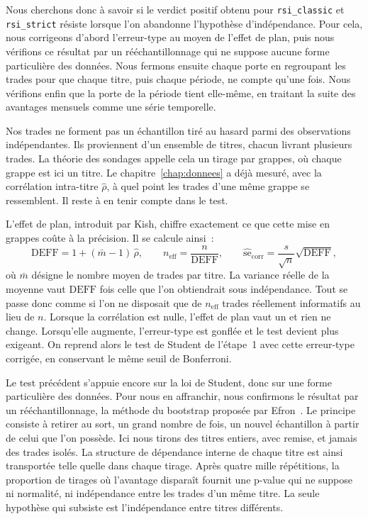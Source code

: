 Nous cherchons donc à savoir si le verdict positif obtenu pour
\texttt{rsi\_classic} et \texttt{rsi\_strict} résiste lorsque l'on
abandonne l'hypothèse d'indépendance. Pour cela, nous corrigeons d'abord
l'erreur-type au moyen de l'effet de plan, puis nous vérifions ce
résultat par un rééchantillonnage qui ne suppose aucune forme
particulière des données. Nous fermons ensuite chaque porte en
regroupant les trades pour que chaque titre, puis chaque période, ne
compte qu'une fois. Nous vérifions enfin que la porte de la période
tient elle-même, en traitant la suite des avantages mensuels comme une
série temporelle.


Nos trades ne forment pas un échantillon tiré au hasard parmi des
observations indépendantes. Ils proviennent d'un ensemble de titres,
chacun livrant plusieurs trades. La théorie des sondages appelle cela un
tirage par grappes, où chaque grappe est ici un titre. Le
chapitre~\ref{chap:donnees} a déjà mesuré, avec la corrélation
intra-titre $\hat\rho$, à quel point les trades d'une même grappe se
ressemblent. Il reste à en tenir compte dans le test.

L'effet de plan, introduit par Kish, chiffre exactement ce que cette
mise en grappes coûte à la précision. Il se calcule ainsi~:
\[
  \mathrm{DEFF} = 1 + (\bar m - 1)\,\hat\rho,
  \qquad n_{\mathrm{eff}} = \frac{n}{\mathrm{DEFF}},
  \qquad \widehat{\mathrm{se}}_{\mathrm{corr}}
        = \frac{s}{\sqrt{n}}\sqrt{\mathrm{DEFF}},
\]
où $\bar m$ désigne le nombre moyen de trades par titre. La variance
réelle de la moyenne vaut $\mathrm{DEFF}$ fois celle que l'on
obtiendrait sous indépendance. Tout se passe donc comme si l'on ne
disposait que de $n_{\mathrm{eff}}$ trades réellement informatifs au
lieu de $n$. Lorsque la corrélation est nulle, l'effet de plan vaut un
et rien ne change. Lorsqu'elle augmente, l'erreur-type est gonflée et le
test devient plus exigeant. On reprend alors le test de Student de
l'étape~1 avec cette erreur-type corrigée, en conservant le même seuil
de Bonferroni.


Le test précédent s'appuie encore sur la loi de Student, donc sur une
forme particulière des données. Pour nous en affranchir, nous confirmons
le résultat par un rééchantillonnage, la méthode du bootstrap proposée
par Efron~\cite{efron1979}. Le principe consiste à retirer au sort, un
grand nombre de fois, un nouvel échantillon à partir de celui que l'on
possède. Ici nous tirons des titres entiers, avec remise, et jamais des
trades isolés. La structure de dépendance interne de chaque titre est
ainsi transportée telle quelle dans chaque tirage. Après quatre mille
répétitions, la proportion de tirages où l'avantage disparaît fournit
une p-value qui ne suppose ni normalité, ni indépendance entre les
trades d'un même titre. La seule hypothèse qui subsiste est
l'indépendance entre titres différents.

